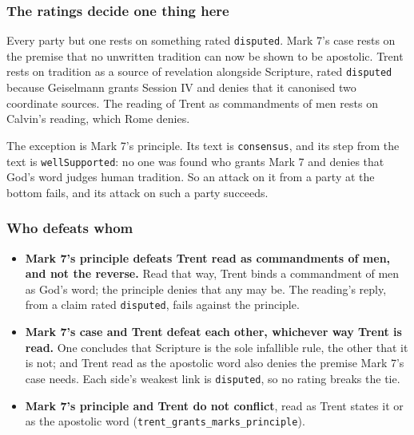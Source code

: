\documentclass[11pt]{article}
\begin{document}
\subsubsection*{The ratings decide one thing here}
Every party but one rests on something rated \texttt{disputed}. Mark 7’s case rests on the premise that no unwritten tradition can now be shown to be apostolic. Trent rests on tradition as a source of revelation alongside Scripture, rated \texttt{disputed} because Geiselmann grants Session IV and denies that it canonised two coordinate sources. The reading of Trent as commandments of men rests on Calvin’s reading, which Rome denies.

The exception is Mark 7’s principle. Its text is \texttt{consensus}, and its step from the text is \texttt{well\allowbreak{}Supported}: no one was found who grants Mark 7 and denies that God’s word judges human tradition. So an attack on it from a party at the bottom fails, and its attack on such a party succeeds.

\subsubsection*{Who defeats whom}
\begin{itemize}
  \item \textbf{Mark 7’s principle defeats Trent read as commandments of men, and not the reverse.} Read that way, Trent binds a commandment of men as God’s word; the principle denies that any may be. The reading’s reply, from a claim rated \texttt{disputed}, fails against the principle.
  \item \textbf{Mark 7’s case and Trent defeat each other, whichever way Trent is read.} One concludes that Scripture is the sole infallible rule, the other that it is not; and Trent read as the apostolic word also denies the premise Mark 7’s case needs. Each side’s weakest link is \texttt{disputed}, so no rating breaks the tie.
  \item \textbf{Mark 7’s principle and Trent do not conflict}, read as Trent states it or as the apostolic word (\texttt{trent\_\allowbreak{}grants\_\allowbreak{}marks\_\allowbreak{}principle}).
\end{itemize}
\end{document}
